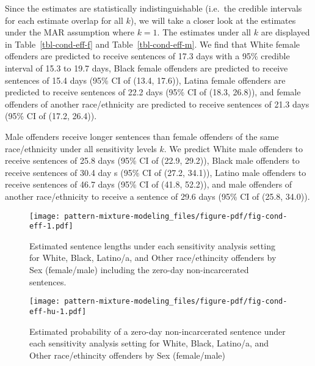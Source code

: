 \documentclass[
  letterpaper,
  DIV=11,
  numbers=noendperiod]{scrartcl}
\begin{document}
Since the estimates are statistically indistinguishable (i.e.~the
credible intervals for each estimate overlap for all \(k\)), we will
take a closer look at the estimates under the MAR assumption where
\(k = 1\). The estimates under all \(k\) are displayed in
Table~\ref{tbl-cond-eff-f} and Table~\ref{tbl-cond-eff-m}. We find that
White female offenders are predicted to receive sentences of 17.3 days
with a 95\% credible interval of 15.3 to 19.7 days, Black female
offenders are predicted to receive sentences of 15.4 days (95\% CI of
(13.4, 17.6)), Latina female offenders are predicted to receive
sentences of 22.2 days (95\% CI of (18.3, 26.8)), and female offenders
of another race/ethnicity are predicted to receive sentences of 21.3
days (95\% CI of (17.2, 26.4)).

Male offenders receive longer sentences than female offenders of the
same race/ethnicity under all sensitivity levels \(k\). We predict White
male offenders to receive sentences of 25.8 days (95\% CI of (22.9,
29.2)), Black male offenders to receive sentences of 30.4 day s (95\% CI
of (27.2, 34.1)), Latino male offenders to receive sentences of 46.7
days (95\% CI of (41.8, 52.2)), and male offenders of another
race/ethnicity to receive a sentence of 29.6 days (95\% CI of (25.8,
34.0)).

\begin{figure}

{\centering \texttt{[image: pattern-mixture-modeling\_files/figure-pdf/fig-cond-eff-1.pdf]}

}

\caption{\label{fig-cond-eff}Estimated sentence lengths under each
sensitivity analysis setting for White, Black, Latino/a, and Other
race/ethincity offenders by Sex (female/male) including the zero-day
non-incarcerated sentences.}

\end{figure}

\begin{figure}

{\centering \texttt{[image: pattern-mixture-modeling\_files/figure-pdf/fig-cond-eff-hu-1.pdf]}

}

\caption{\label{fig-cond-eff-hu}Estimated probability of a zero-day
non-incarcerated sentence under each sensitivity analysis setting for
White, Black, Latino/a, and Other race/ethincity offenders by Sex
(female/male)}

\end{figure}
\end{document}
